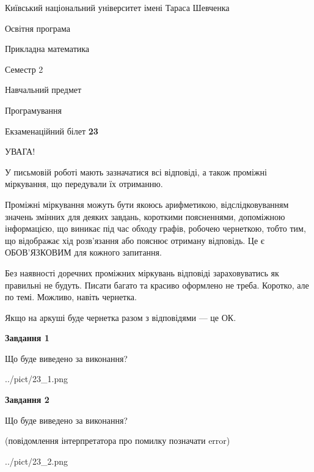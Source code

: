 \documentclass[12pt, ukrainian]{article}
\begin{document}
{{\begin {small}\par
{ \center  Київський національний університет імені Тараса Шевченка \par}
{\parbox {5 cm}{Освітня програма \hfill}{\parbox {7 cm}{Прикладна математика\hfill}}\parbox {6 cm}{\hfill Семестр 2}}\par
{\parbox {5 cm} {Навчальний предмет \hfill}\parbox {7 cm}{Програмування \hfill}\parbox {6cm}{\hfill}\par}\vspace{-7pt} \end{small}}{\center Екзаменаційний білет \No \textbf
{ 23 }\par}}
{
\begin {large}
УВАГА!

У письмовій роботі мають зазначатися всі відповіді, а також проміжні міркування, що передували їх отриманню.

Проміжні міркування можуть бути якоюсь арифметикою, відслідковуванням зна\-чень змінних для деяких завдань,
короткими поясненнями, допоміжною інформацією, що виникає під час обходу графів, робочею чернеткою,
тобто тим, що відображає хід розв’язання або пояснює отриману відповідь.
Це є ОБОВ’ЯЗКОВИМ для кожного запитання.

Без наявності доречних проміжних міркувань відповіді зараховуватись як правиль\-ні не будуть.
Писати багато та красиво оформлено не треба. Коротко, але по темі. Можли\-во, навіть чернетка.

Якщо на аркуші буде чернетка разом з відповідями --- це ОК.

\newpage

{\begin {center}\textbf{Завдання 1}\end {center}}\par
Що буде виведено за виконання?\par
\begin{center}
	{../pict/23_1.png}
\end{center}
\newpage

{\begin {center}\textbf{Завдання 2}\end {center}}\par
Що буде виведено за виконання?\par
 (повідомлення інтерпретатора про помилку позначати error)\par
\begin{center}
	{../pict/23_2.png}
\end{center}
\newpage


\end{large}}
\end{document}
